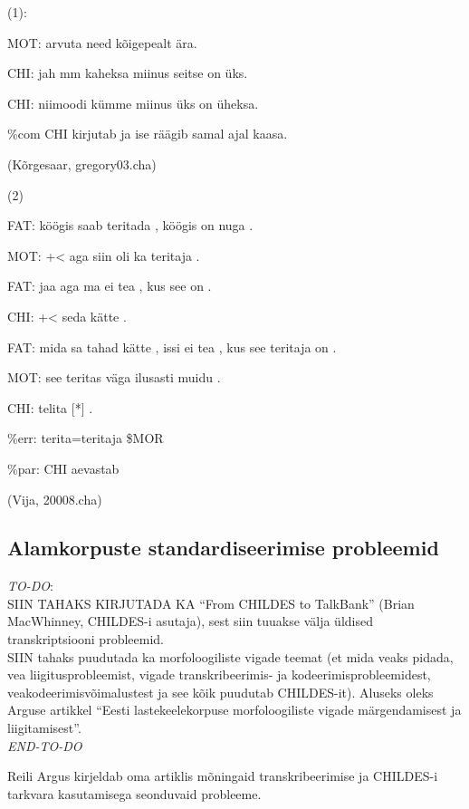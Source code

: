 \documentclass[12pt]{article}
\begin{document}
(1):
\begin{description}
    \item*MOT: arvuta need kõigepealt ära.
    \item*CHI: jah mm kaheksa miinus seitse on üks.
    \item*CHI: niimoodi kümme miinus üks on üheksa.
    \item\%com CHI kirjutab ja ise räägib samal ajal kaasa.
    \item(Kõrgesaar, gregory03.cha)
\end{description}
\hfill

(2)
\begin{description}
    \item*FAT:   köögis saab teritada , köögis on nuga .
    \item*MOT:   +< aga siin oli ka teritaja .
    \item*FAT:   jaa aga ma ei tea , kus see on .
    \item*CHI:   +< seda kätte .
    \item*FAT:   mida sa tahad kätte , issi ei tea , kus see teritaja on .
    \item*MOT:   see teritas väga ilusasti muidu .
    \item*CHI:   telita [*] .
    \item\%err:   terita=teritaja \$MOR
    \item\%par:   CHI aevastab
    \item(Vija, 20008.cha)
\end{description}


\subsection{Alamkorpuste standardiseerimise probleemid}

\emph{TO-DO}:\\
SIIN TAHAKS KIRJUTADA KA ``From CHILDES to TalkBank'' (Brian MacWhinney, CHILDES-i asutaja), sest siin tuuakse välja üldised transkriptsiooni probleemid.\\
SIIN tahaks puudutada ka morfoloogiliste vigade teemat (et mida veaks pidada, vea liigitusprobleemist, vigade transkribeerimis- ja kodeerimisprobleemidest, veakodeerimisvõimalustest ja see kõik puudutab CHILDES-it). Aluseks oleks Arguse artikkel ``Eesti lastekeelekorpuse morfoloogiliste vigade
märgendamisest ja liigitamisest''.\\
\emph{END-TO-DO}

Reili Argus kirjeldab oma artiklis \citep{Argus2007} mõningaid transkribeerimise ja CHILDES-i tarkvara kasutamisega seonduvaid probleeme.
\end{document}
